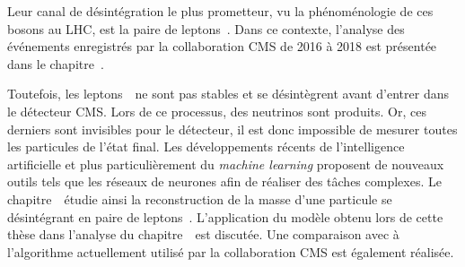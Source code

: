Leur canal de désintégration le plus prometteur,
vu la phénoménologie de ces bosons au LHC,
est la paire de leptons~\tau.
Dans ce contexte,
l'analyse des événements enregistrés par la collaboration CMS de 2016 à 2018
est présentée dans le chapitre~.
\par
Toutefois,
les leptons~\tau\ ne sont pas stables
et se désintègrent avant d'entrer dans le détecteur CMS.
Lors de ce processus,
des neutrinos sont produits.
Or, ces derniers sont invisibles pour le détecteur,
il est donc impossible de mesurer toutes les particules de l'état final.
Les développements récents de l'intelligence artificielle
et plus particulièrement du \emph{machine learning}
proposent de nouveaux outils tels que les réseaux de neurones
afin de réaliser des tâches complexes.
Le chapitre~\ étudie ainsi
la reconstruction de la masse d'une particule se désintégrant en paire de leptons~\tau.
L'application du modèle obtenu lors de cette thèse
dans l'analyse du chapitre~\ est discutée.
Une comparaison avec
à l'algorithme actuellement utilisé par la collaboration CMS
est également réalisée.